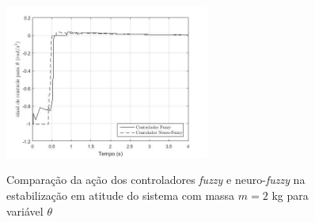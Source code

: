 \begin{figure}[!htb]
    \centering
    \caption{Comparação da ação dos controladores \textit{fuzzy} e neuro-\textit{fuzzy} na estabilização em atitude do sistema com massa $m=2$ kg para variável $\theta$}
    \includegraphics[width=0.6\textwidth]{./04-figuras/figuras_pos_banca/4-atitude5kg/fig_contoller_theta_5kg}
    \label{fig:fig_contoller_theta_5kg}
\end{figure}




